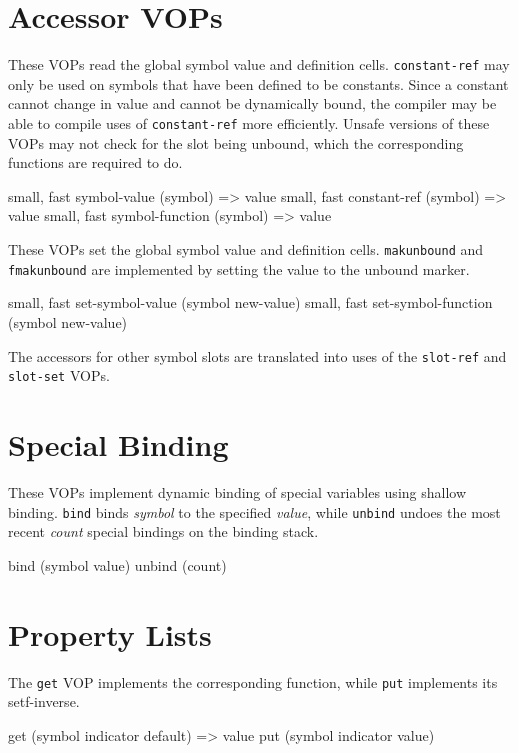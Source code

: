{
\section{Accessor VOPs}

These VOPs read the global symbol value and definition cells.  {\tt constant-ref}
may only be used on symbols that have been defined to be constants.  Since a
constant cannot change in value and cannot be dynamically bound, the compiler
may be able to compile uses of {\tt constant-ref} more efficiently.  Unsafe
versions of these VOPs may not check for the slot being unbound, which the
corresponding \clisp functions are required to do.
\begin{example}
{small, fast} symbol-value (symbol) => value
{small, fast} constant-ref (symbol) => value
{small, fast} symbol-function (symbol) => value
\end{example}

These VOPs set the global symbol value and definition cells.  {\tt makunbound}
and {\tt fmakunbound} are implemented by setting the value to the unbound marker.
\begin{example}
{small, fast} set-symbol-value (symbol new-value)
{small, fast} set-symbol-function (symbol new-value)
\end{example}

The \clisp accessors for other symbol slots are translated into uses of the
{\tt slot-ref} and {\tt slot-set} VOPs.



\section{Special Binding}

These VOPs implement dynamic binding of special variables using shallow
binding.  {\tt bind} binds {\it symbol} to the specified {\it value}, while
{\tt unbind} undoes the most recent {\it count} special bindings on the binding
stack.
\begin{example}
bind (symbol value)
unbind (count)
\end{example}


\section{Property Lists}

The {\tt get} VOP implements the corresponding \clisp function, while {\tt put}
implements its setf-inverse.
\begin{example}
get (symbol indicator default) => value
put (symbol indicator value)
\end{example}

}
